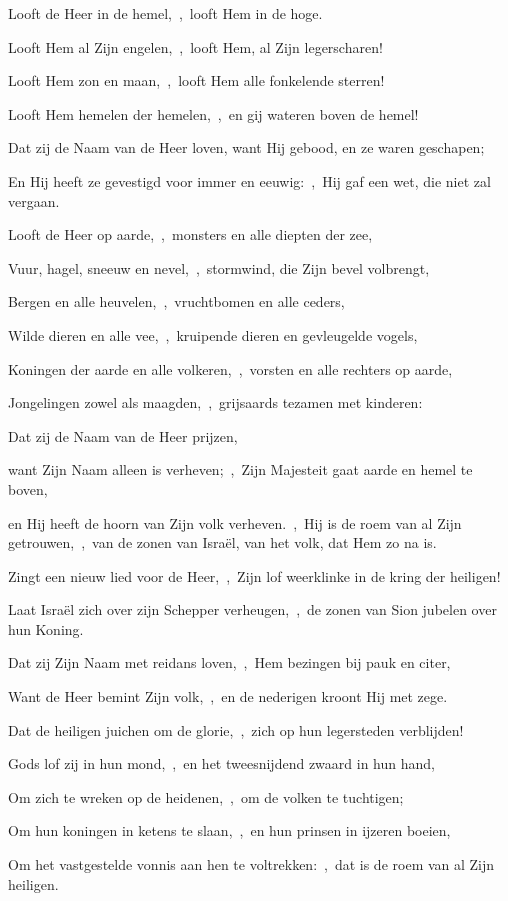 \documentclass[12pt,twoside,a5paper]{article}
\begin{document}
\begin{halfparskip}
   Looft de Heer in de hemel,~\sep\ looft Hem in de hoge.

  Looft Hem al Zijn engelen,~\sep\ looft Hem, al Zijn legerscharen!

  Looft Hem zon en maan,~\sep\ looft Hem alle fonkelende sterren!

  Looft Hem hemelen der hemelen,~\sep\ en gij wateren boven de hemel!

  Dat zij de Naam van de Heer loven, want Hij gebood, en ze waren geschapen;

  En Hij heeft ze gevestigd voor immer en eeuwig:~\sep\ Hij gaf een wet, die niet zal vergaan.

  Looft de Heer op aarde,~\sep\ monsters en alle diepten der zee,

  Vuur, hagel, sneeuw en nevel,~\sep\ stormwind, die Zijn bevel volbrengt,

  Bergen en alle heuvelen,~\sep\ vruchtbomen en alle ceders,

  Wilde dieren en alle vee,~\sep\ kruipende dieren en gevleugelde vogels,

  Koningen der aarde en alle volkeren,~\sep\ vorsten en alle rechters op aarde,

  Jongelingen zowel als maagden,~\sep\ grijsaards tezamen met kinderen:

  Dat zij de Naam van de Heer prijzen,

  want Zijn Naam alleen is verheven;~\sep\ Zijn Majesteit gaat aarde en hemel te boven,

  en Hij heeft de hoorn van Zijn volk verheven.~\sep\ Hij is de roem van al Zijn getrouwen,~\sep\ van de zonen van Israël, van het volk, dat Hem zo na is.
\end{halfparskip}

\begin{halfparskip}
   Zingt een nieuw lied voor de Heer,~\sep\ Zijn lof weerklinke in de kring der heiligen!

  Laat Israël zich over zijn Schepper verheugen,~\sep\ de zonen van Sion jubelen over hun Koning.

  Dat zij Zijn Naam met reidans loven,~\sep\ Hem bezingen bij pauk en citer,

  Want de Heer bemint Zijn volk,~\sep\ en de nederigen kroont Hij met zege.

  Dat de heiligen juichen om de glorie,~\sep\ zich op hun legersteden verblijden!

  Gods lof zij in hun mond,~\sep\ en het tweesnijdend zwaard in hun hand,

  Om zich te wreken op de heidenen,~\sep\ om de volken te tuchtigen;

  Om hun koningen in ketens te slaan,~\sep\ en hun prinsen in ijzeren boeien,

  Om het vastgestelde vonnis aan hen te voltrekken:~\sep\ dat is de roem van al Zijn heiligen.
\end{halfparskip}
\end{document}
